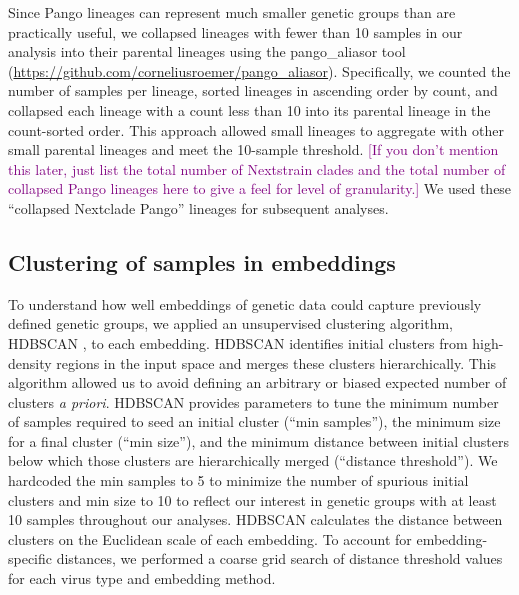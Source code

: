 \documentclass[10pt,letterpaper]{article}
\def\tbc#1{\textcolor{purple}{[#1]}}
\begin{document}
Since Pango lineages can represent much smaller genetic groups than are practically useful, we collapsed lineages with fewer than 10 samples in our analysis into their parental lineages using the pango\_aliasor tool (\href{https://github.com/corneliusroemer/pango_aliasor}{https://github.com/corneliusroemer/pango\_aliasor}).
Specifically, we counted the number of samples per lineage, sorted lineages in ascending order by count, and collapsed each lineage with a count less than 10 into its parental lineage in the count-sorted order.
This approach allowed small lineages to aggregate with other small parental lineages and meet the 10-sample threshold.
\tbc{If you don't mention this later, just list the total number of Nextstrain clades and the total number of collapsed Pango lineages here to give a feel for level of granularity.}
We used these ``collapsed Nextclade Pango'' lineages for subsequent analyses.

\subsection*{Clustering of samples in embeddings}

To understand how well embeddings of genetic data could capture previously defined genetic groups, we applied an unsupervised clustering algorithm, HDBSCAN \cite{campello2015hierarchical}, to each embedding.
HDBSCAN identifies initial clusters from high-density regions in the input space and merges these clusters hierarchically.
This algorithm allowed us to avoid defining an arbitrary or biased expected number of clusters \emph{a priori}.
HDBSCAN provides parameters to tune the minimum number of samples required to seed an initial cluster (``min samples''), the minimum size for a final cluster (``min size''), and the minimum distance between initial clusters below which those clusters are hierarchically merged (``distance threshold'').
We hardcoded the min samples to 5 to minimize the number of spurious initial clusters and min size to 10 to reflect our interest in genetic groups with at least 10 samples throughout our analyses.
HDBSCAN calculates the distance between clusters on the Euclidean scale of each embedding.
To account for embedding-specific distances, we performed a coarse grid search of distance threshold values for each virus type and embedding method.
\end{document}
